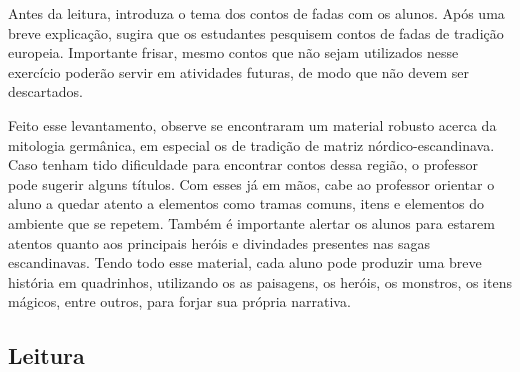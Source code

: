 \documentclass[12pt]{extarticle}
\begin{document}
Antes da leitura, introduza o tema dos contos de fadas com
os alunos. Após uma breve explicação, sugira que os estudantes pesquisem
contos de fadas de tradição europeia. Importante frisar, mesmo contos
que não sejam utilizados nesse exercício poderão servir em atividades
futuras, de modo que não devem ser descartados.

Feito esse levantamento, observe se encontraram um material robusto
acerca da mitologia germânica, em especial os de tradição de matriz
nórdico-escandinava. Caso tenham tido dificuldade para encontrar contos
dessa região, o professor pode sugerir alguns títulos. Com esses já em
mãos, cabe ao professor orientar o aluno a quedar atento a elementos
como tramas comuns, itens e elementos do ambiente que se repetem. Também
é importante alertar os alunos para estarem atentos quanto aos
principais heróis e divindades presentes nas sagas escandinavas. Tendo
todo esse material, cada aluno pode produzir uma breve história em
quadrinhos, utilizando os as paisagens, os heróis, os monstros, os itens
mágicos, entre outros, para forjar sua própria narrativa.











\subsection{Leitura}

\end{document}
